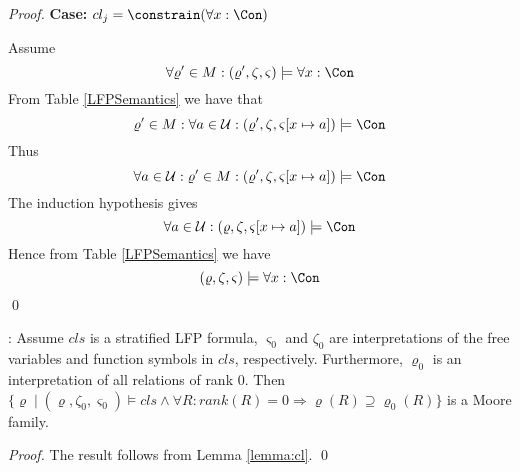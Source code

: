 \begin{proof}
\noindent\textbf{Case: }$cl_j=\constrain(\forall x: \Con)$

\noindent Assume
\begin{equation}
  \forall \varrho' \in M: (\varrho',\zeta,\varsigma) \models \forall x: \Con
\end{equation}
From Table \ref{LFPSemantics} we have that
$$
\varrho' \in M: \forall a \in \mathcal{U}: (\varrho',\zeta,\varsigma[x
\mapsto a]) \models \Con
$$
Thus
$$
\forall a \in \mathcal{U}: \varrho' \in M: (\varrho',\zeta,\varsigma[x
\mapsto a]) \models \Con
$$
The induction hypothesis gives
$$
\forall a \in \mathcal{U}: (\varrho,\zeta,\varsigma[x
\mapsto a]) \models \Con
$$
Hence from Table \ref{LFPSemantics} we have
$$
 (\varrho,\zeta,\varsigma) \models \forall x: \Con
$$
\qed
\end{proof}

: Assume $cls$ is a
stratified LFP formula, $\varsigma_0$ and $\zeta_0$ are
interpretations of the free variables and function symbols in $cls$,
respectively. Furthermore, $\varrho_0$ is an interpretation of all
relations of rank 0. Then $\{ \varrho \mid (\varrho, \zeta_0,
\varsigma_0) \models cls \wedge \forall R: rank(R) = 0 \Rightarrow
\varrho(R) \supseteq \varrho_0(R) \}$ is a Moore family.
\begin{proof}
The result follows from Lemma \ref{lemma:cl}.
\qed
\end{proof}

